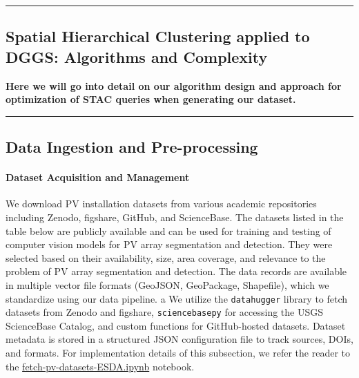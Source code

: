 {\color{gray}\hrule}
\begin{center}
\section{Spatial Hierarchical Clustering applied to DGGS: Algorithms and Complexity}
\textbf{Here we will go into detail on our algorithm design and approach for optimization of STAC queries when generating our dataset.}
\bigskip
\end{center}
{\color{gray}\hrule}


\subsection{Data Ingestion and Pre-processing}
\label{subsec:data_ingestion}

\paragraph{Dataset Acquisition and Management} 
We download PV installation datasets from various academic repositories including Zenodo, figshare, GitHub, and ScienceBase. 
The datasets listed in the table below are publicly available and can be used for training and testing of computer vision models for PV array segmentation and detection. 
They were selected based on their availability, size, area coverage, and relevance to the problem of PV array segmentation and detection.
The data records are available in multiple vector file formats (GeoJSON, GeoPackage, Shapefile), which we standardize using our data pipeline. a
We utilize the \texttt{datahugger} library to fetch datasets from Zenodo and figshare, \texttt{sciencebasepy} for accessing the USGS ScienceBase Catalog, 
and custom functions for GitHub-hosted datasets. Dataset metadata is stored in a structured JSON configuration file to track sources, DOIs, and formats. 
For implementation details of this subsection, we refer the reader to the \href{https://github.com/avega17/CCOM_MS_Spring_2025_EO_PV_research/blob/main/fetch-pv-datasets-ESDA.ipynb}{fetch-pv-datasets-ESDA.ipynb} notebook.

